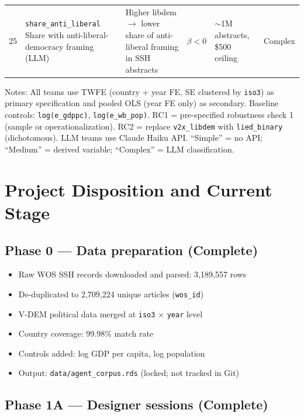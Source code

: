 \documentclass[12pt,a4paper]{article}
\begin{document}
\begin{landscape}
\begin{longtable}{
  @{}
  p{0.6cm}   %
  p{3.6cm}   %
  p{6.0cm}   %
  p{1.4cm}   %
  p{4.0cm}   %
  p{1.2cm}   %
  @{}
}
25 & \texttt{share\_anti\_liberal} \newline \footnotesize{Share with anti-liberal-democracy framing (LLM)}
   & Higher libdem $\to$ lower share of anti-liberal framing in SSH abstracts
   & $\beta < 0$ & ${\sim}$1M abstracts, \$500 ceiling & Complex \\[4pt]

\end{longtable}
\end{landscape}

\noindent Notes: All teams use TWFE (country + year FE, SE clustered by \texttt{iso3}) as primary specification
and pooled OLS (year FE only) as secondary. Baseline controls: \texttt{log(e\_gdppc)},
\texttt{log(e\_wb\_pop)}. RC1 = pre-specified robustness check 1 (sample or operationalization).
RC2 = replace \texttt{v2x\_libdem} with \texttt{lied\_binary} (dichotomous). LLM teams use Claude Haiku API.
``Simple'' = no API; ``Medium'' = derived variable; ``Complex'' = LLM classification.

\section{Project Disposition and Current Stage}
\label{sec:disposition}

\subsection{Phase 0 --- Data preparation (Complete)}

\begin{itemize}
  \item Raw WOS SSH records downloaded and parsed: 3,189,557 rows
  \item De-duplicated to 2,709,224 unique articles (\texttt{wos\_id})
  \item V-DEM political data merged at \texttt{iso3} $\times$ \texttt{year} level
  \item Country coverage: 99.98\% match rate
  \item Controls added: log GDP per capita, log population
  \item Output: \texttt{data/agent\_corpus.rds} (locked; not tracked in Git)
\end{itemize}

\subsection{Phase 1A --- Designer sessions (Complete)}
\end{document}
